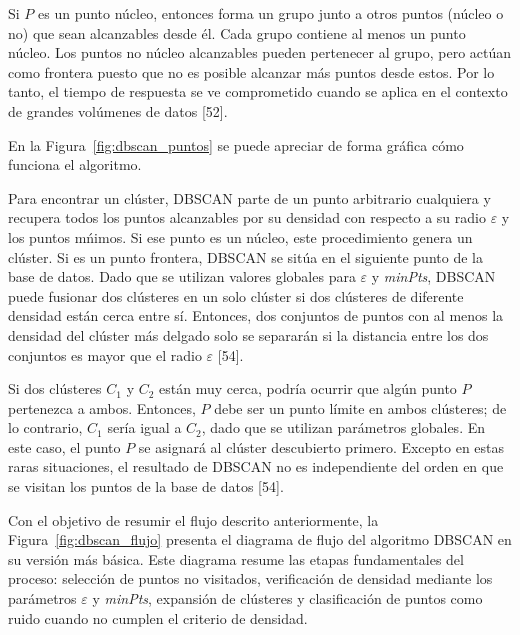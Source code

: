 Si $P$ es un punto n\'ucleo, entonces forma un grupo junto a otros puntos (n\'ucleo o no) que sean alcanzables desde \'el. Cada grupo contiene al menos un punto n\'ucleo. Los puntos no n\'ucleo alcanzables pueden pertenecer al grupo, pero act\'uan como frontera puesto que no es posible alcanzar m\'as puntos desde estos. Por lo tanto, el tiempo de respuesta se ve comprometido cuando se aplica en el contexto de grandes vol\'umenes de datos [52].

En la Figura~\ref{fig:dbscan_puntos} se puede apreciar de forma gr\'afica c\'omo funciona el algoritmo.


Para encontrar un cl\'uster, DBSCAN parte de un punto arbitrario cualquiera y recupera todos los puntos alcanzables por su densidad con respecto a su radio $\varepsilon$ y los puntos m\'nimos. Si ese punto es un n\'ucleo, este procedimiento genera un cl\'uster. Si es un punto frontera, DBSCAN se sit\'ua en el siguiente punto de la base de datos. Dado que se utilizan valores globales para $\varepsilon$ y \textit{minPts}, DBSCAN puede fusionar dos cl\'usteres en un solo cl\'uster si dos cl\'usteres de diferente densidad est\'an cerca entre s\'i. Entonces, dos conjuntos de puntos con al menos la densidad del cl\'uster m\'as delgado solo se separar\'an si la distancia entre los dos conjuntos es mayor que el radio $\varepsilon$ [54].

Si dos cl\'usteres $C_{1}$ y $C_{2}$ est\'an muy cerca, podr\'ia ocurrir que alg\'un punto $P$ pertenezca a ambos. Entonces, $P$ debe ser un punto l\'imite en ambos cl\'usteres; de lo contrario, $C_{1}$ ser\'ia igual a $C_{2}$, dado que se utilizan par\'ametros globales. En este caso, el punto $P$ se asignar\'a al cl\'uster descubierto primero. Excepto en estas raras situaciones, el resultado de DBSCAN no es independiente del orden en que se visitan los puntos de la base de datos [54].

Con el objetivo de resumir el flujo descrito anteriormente, la Figura~\ref{fig:dbscan_flujo} presenta el diagrama de flujo del algoritmo DBSCAN en su versi\'on m\'as b\'asica. Este diagrama resume las etapas fundamentales del proceso: selecci\'on de puntos no visitados, verificaci\'on de densidad mediante los par\'ametros $\varepsilon$ y \textit{minPts}, expansi\'on de cl\'usteres y clasificaci\'on de puntos como ruido cuando no cumplen el criterio de densidad.


